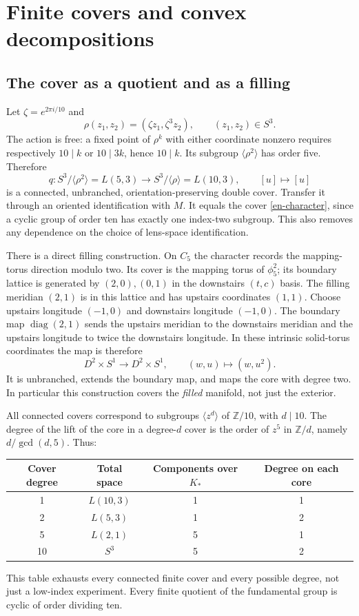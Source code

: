 \documentclass[12pt]{amsart}
\theoremstyle{definition}
\theoremstyle{remark}
\numberwithin{equation}{section}
\newcommand{\Z}{\mathbb{Z}}
\theoremstyle{definition}
\begin{document}
\section{Finite covers and convex decompositions}\label{en-covers}
\subsection{The cover as a quotient and as a filling}
Let $\zeta=e^{2\pi i/10}$ and
\[
\rho(z_1,z_2)=(\zeta z_1,\zeta^3z_2),\qquad (z_1,z_2)\in S^3.
\]
The action is free: a fixed point of $\rho^k$ with either coordinate nonzero requires respectively $10\mid k$ or $10\mid3k$, hence $10\mid k$. Its subgroup $\langle\rho^2\rangle$ has order five. Therefore
\begin{equation}\label{en-covermap}
q:S^3/\langle\rho^2\rangle=L(5,3)\longrightarrow
S^3/\langle\rho\rangle=L(10,3),\qquad [u]\longmapsto[u]
\end{equation}
is a connected, unbranched, orientation-preserving double cover. Transfer it through an oriented identification with $M$. It equals the cover \eqref{en-character}, since a cyclic group of order ten has exactly one index-two subgroup. This also removes any dependence on the choice of lens-space identification.

There is a direct filling construction. On $C_5$ the character records the mapping-torus direction modulo two. Its cover is the mapping torus of $\phi_5^2$; its boundary lattice is generated by $(2,0),(0,1)$ in the downstairs $(t,c)$ basis. The filling meridian $(2,1)$ is in this lattice and has upstairs coordinates $(1,1)$. Choose upstairs longitude $(-1,0)$ and downstairs longitude $(-1,0)$. The boundary map $\operatorname{diag}(2,1)$ sends the upstairs meridian to the downstairs meridian and the upstairs longitude to twice the downstairs longitude. In these intrinsic solid-torus coordinates the map is therefore
\[
D^2\times S^1\longrightarrow D^2\times S^1,\qquad(w,u)\longmapsto(w,u^2).
\]
It is unbranched, extends the boundary map, and maps the core with degree two. In particular this construction covers the \emph{filled} manifold, not just the exterior.

All connected covers correspond to subgroups $\langle z^d\rangle$ of $\Z/10$, with $d\mid10$. The degree of the lift of the core in a degree-$d$ cover is the order of $z^5$ in $\Z/d$, namely $d/\gcd(d,5)$. Thus:
\begin{center}
\begin{tabular}{cccc}\toprule
Cover degree & Total space & Components over $K_*$ & Degree on each core\\\midrule
1 & $L(10,3)$ & 1 & 1\\
2 & $L(5,3)$ & 1 & 2\\
5 & $L(2,1)$ & 5 & 1\\
10 & $S^3$ & 5 & 2\\\bottomrule
\end{tabular}
\end{center}
This table exhausts every connected finite cover and every possible degree, not just a low-index experiment. Every finite quotient of the fundamental group is cyclic of order dividing ten.
\end{document}
